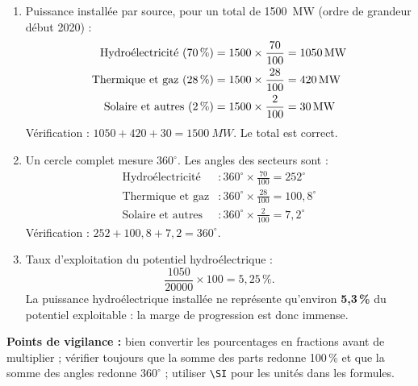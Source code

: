 \documentclass[11pt]{article}
\begin{document}
\begin{corrige}
\begin{enumerate}
\item Puissance installée par source, pour un total de \SI{1500}{MW} (ordre de grandeur début 2020) :
\begin{align*}
\text{Hydroélectricité (70\,\%)} &= 1500 \times \frac{70}{100} = \SI{1050}{MW}\\
\text{Thermique et gaz (28\,\%)} &= 1500 \times \frac{28}{100} = \SI{420}{MW}\\
\text{Solaire et autres (2\,\%)} &= 1500 \times \frac{2}{100} = \SI{30}{MW}
\end{align*}
Vérification : $1050 + 420 + 30 = \SI{1500}{MW}$. Le total est correct.
\item Un cercle complet mesure $360^{\circ}$. Les angles des secteurs sont :
\begin{align*}
\text{Hydroélectricité} &: 360^{\circ} \times \frac{70}{100} = 252^{\circ}\\
\text{Thermique et gaz} &: 360^{\circ} \times \frac{28}{100} = 100{,}8^{\circ}\\
\text{Solaire et autres} &: 360^{\circ} \times \frac{2}{100} = 7{,}2^{\circ}
\end{align*}
Vérification : $252 + 100{,}8 + 7{,}2 = 360^{\circ}$.
\item Taux d'exploitation du potentiel hydroélectrique :
\[ \frac{1050}{20000} \times 100 = 5{,}25\,\%. \]
La puissance hydroélectrique installée ne représente qu'environ \textbf{5,3\,\%} du potentiel exploitable : la marge de progression est donc immense.
\end{enumerate}
\textbf{Points de vigilance :} bien convertir les pourcentages en fractions avant de multiplier ; vérifier toujours que la somme des parts redonne 100\,\% et que la somme des angles redonne $360^{\circ}$ ; utiliser \texttt{\textbackslash SI} pour les unités dans les formules.
\end{corrige}
\end{document}
